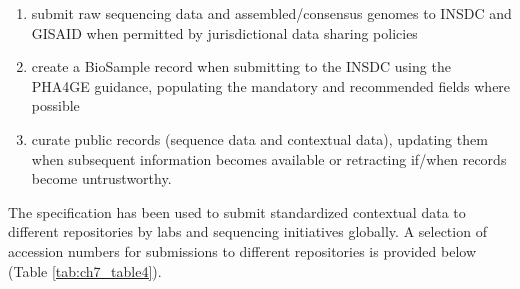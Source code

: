 \begin{enumerate}
    \item submit raw sequencing data and assembled/consensus genomes to INSDC and GISAID when permitted by jurisdictional data sharing policies
    \item create a BioSample record when submitting to the INSDC using the PHA4GE guidance, populating the mandatory and recommended fields where possible
    \item curate public records (sequence data and contextual data), updating them when subsequent information becomes available or retracting if/when records become untrustworthy. 
\end{enumerate}



The specification has been used to submit standardized contextual data to different repositories by labs and sequencing initiatives globally. A selection of accession numbers for submissions to different repositories is provided below (Table \ref{tab:ch7_table4}).

